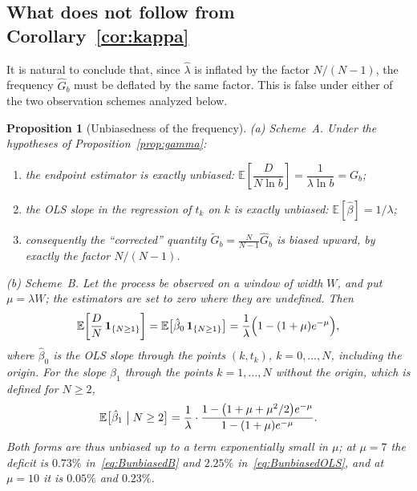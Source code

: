\documentclass[11pt,a4paper]{article}
\theoremstyle{plain}
\newtheorem{proposition}{Proposition}
\theoremstyle{remark}
\begin{document}
\subsection{What does not follow from Corollary~\ref{cor:kappa}}

It is natural to conclude that, since $\hat\lambda$ is inflated by the factor
$N/(N-1)$, the frequency $\hat G_b$ must be deflated by the same factor. This is
false under either of the two observation schemes analyzed below.

\begin{proposition}[Unbiasedness of the frequency]\label{prop:unbiased}
\emph{(a) Scheme~A.} Under the hypotheses of Proposition~\ref{prop:gamma}:
\begin{enumerate}
\item[\rm(i)] the endpoint estimator is exactly unbiased:
$\mathbb E\!\left[\dfrac{D}{N\ln b}\right]=\dfrac{1}{\lambda\ln b}=G_b$;
\item[\rm(ii)] the OLS slope in the regression of $t_k$ on $k$ is exactly
unbiased: $\mathbb E[\hat\beta]=1/\lambda$;
\item[\rm(iii)] consequently the ``corrected'' quantity
$\tilde G_b=\frac{N}{N-1}\hat G_b$ is biased \emph{upward}, by exactly the
factor $N/(N-1)$.
\end{enumerate}
\emph{(b) Scheme~B.} Let the process be observed on a window of width $W$, and
put $\mu=\lambda W$; the estimators are set to zero where they are undefined.
Then
\begin{equation}\label{eq:BunbiasedB}
\mathbb E\!\left[\frac{D}{N}\,\mathbf 1_{\{N\ge1\}}\right]
=\mathbb E\bigl[\hat\beta_0\,\mathbf 1_{\{N\ge1\}}\bigr]
=\frac{1}{\lambda}\Bigl(1-(1+\mu)e^{-\mu}\Bigr),
\end{equation}
where $\hat\beta_0$ is the OLS slope through the points $(k,t_k)$,
$k=0,\dots,N$, \emph{including} the origin. For the slope $\hat\beta_1$ through
the points $k=1,\dots,N$ \emph{without} the origin, which is defined for
$N\ge2$,
\begin{equation}\label{eq:BunbiasedOLS}
\mathbb E\bigl[\hat\beta_1\bigm|N\ge2\bigr]
=\frac{1}{\lambda}\cdot
\frac{1-\bigl(1+\mu+\mu^2/2\bigr)e^{-\mu}}{1-(1+\mu)e^{-\mu}} .
\end{equation}
Both forms are thus unbiased up to a term exponentially small in $\mu$; at
$\mu=7$ the deficit is $0.73\%$ in~\eqref{eq:BunbiasedB} and $2.25\%$
in~\eqref{eq:BunbiasedOLS}, and at $\mu=10$ it is $0.05\%$ and $0.23\%$.
\end{proposition}
\end{document}

